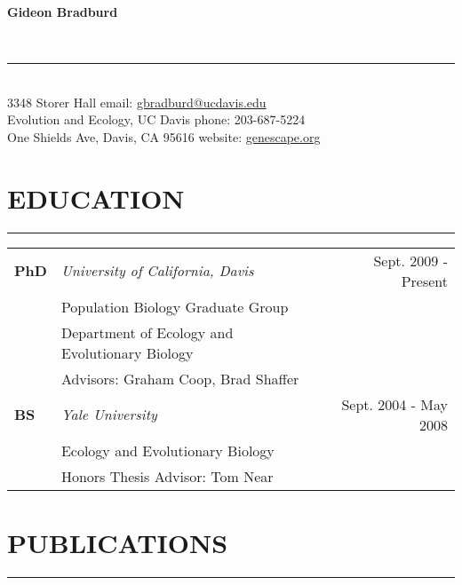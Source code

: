 \documentclass{article}
\begin{document}
%
\begin{huge}
\bf{Gideon Bradburd}\
\end{huge}
\vspace{-0.25cm}
\\
%
\vspace{-0.7cm}
\rule{470pt}{0.4pt}
\vspace{0.3cm}
%
\\
3348 Storer Hall \hfill email: \href{mailto:gbradburd@ucdavis.edu}{gbradburd@ucdavis.edu}\\
Evolution and Ecology, UC Davis \hfill phone: 203-687-5224\\
One Shields Ave, Davis, CA 95616 \hfill website: \href{http://genescape.org}{genescape.org}\\
\vspace{-0.6cm}
%
\section*{EDUCATION}
\vspace{-0.6cm}
\rule{470pt}{0.4pt}
%
\begin{tabular}{@{}p{}p{}R@{}}
\\
\bf{PhD} & \it{University of California, Davis}  & Sept. 2009 - Present \\
 & \hspace{0.5cm}Population Biology Graduate Group & \\
 & \hspace{0.5cm}Department of Ecology and Evolutionary Biology & \\
 & \hspace{0.5cm}Advisors: Graham Coop, Brad Shaffer & \\ 
\textbf{BS} & \it{Yale University} & Sept. 2004 - May 2008 \\
& \hspace{0.5cm}Ecology and Evolutionary Biology & \\
& \hspace{0.5cm}Honors Thesis Advisor: Tom Near & \\
\end{tabular}
%
\section*{PUBLICATIONS}
\vspace{-0.6cm}
\rule{470pt}{0.4pt}
%
\end{document}
